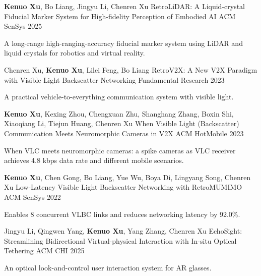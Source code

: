 \documentclass[11pt, a4paper]{awesome-cv}
\begin{document}
\begin{cventries}
	
	\cventry
	{\textbf{Kenuo Xu}, Bo Liang, Jingyu Li, Chenren Xu}
	{RetroLiDAR: A Liquid-crystal Fiducial Marker System for High-fidelity Perception of Embodied AI}
	{ACM SenSys}
	{2025}
	{
		\begin{cvitems} %
			\item {A long-range high-ranging-accuracy fiducial marker system using LiDAR and liquid crystals for robotics and virtual reality.}
		\end{cvitems}
	}
		
	\cventry
	{Chenren Xu, \textbf{Kenuo Xu}, Lilei Feng, Bo Liang}
	{RetroV2X: A New V2X Paradigm with Visible Light Backscatter Networking}
	{Fundamental Research}
	{2023}
	{
		\begin{cvitems} %
			\item {A practical vehicle-to-everything communication system with visible light.}
		\end{cvitems}
	}
	
	\cventry
	{\textbf{Kenuo Xu}, Kexing Zhou, Chengxuan Zhu, Shanghang Zhang, Boxin Shi, Xiaoqiang Li, Tiejun Huang, Chenren Xu}
	{When Visible Light (Backscatter) Communication Meets Neuromorphic Cameras in V2X}
	{ACM HotMobile}
	{2023}
	{
		\begin{cvitems} %
			\item {When VLC meets neuromorphic cameras: a spike cameras as VLC receiver achieves 4.8 kbps data rate and different mobile scenarios.}
		\end{cvitems}
	}
		
	\cventry
	{\textbf{Kenuo Xu}, Chen Gong, Bo Liang, Yue Wu, Boya Di, Lingyang Song, Chenren Xu}
	{Low-Latency Visible Light Backscatter Networking with RetroMUMIMO}
	{ACM SenSys}
	{2022}
	{
		\begin{cvitems} %
			\item {Enables 8 concurrent VLBC links and reduces networking latency by 92.0\%.}
		\end{cvitems}
	}
		
	\cventry
	{Jingyu Li, Qingwen Yang, \textbf{Kenuo Xu}, Yang Zhang, Chenren Xu}
	{EchoSight: Streamlining Bidirectional Virtual-physical Interaction with In-situ Optical Tethering}
	{ACM CHI}
	{2025}
	{
		\begin{cvitems} %
			\item {An optical look-and-control user interaction system for AR glasses.}
		\end{cvitems}
	}
	

\end{cventries}
\end{document}
